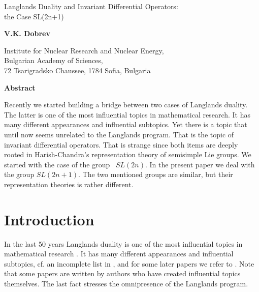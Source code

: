 \documentclass[a4paper]{jpconf}
\begin{document}
\begin{center}

{\tfont Langlands Duality and Invariant Differential Operators:\\[3pt]
the Case SL(2n+1)}

\vskip 1.5cm

{\bf V.K. Dobrev}

 \vskip 5mm

  Institute for Nuclear Research and Nuclear Energy,\\ Bulgarian
Academy of Sciences,\\ 72 Tsarigradsko Chaussee,  1784 Sofia,
Bulgaria

\end{center}

\vskip 1.5cm

 \centerline{{\bf Abstract}}

Recently we started building a bridge between two cases of Langlands duality. The latter is one of the most influential topics in mathematical research.  It has many different appearances and influential subtopics. Yet there is a topic that until now seems unrelated to the Langlands program.  That is the topic of invariant differential operators. That is strange since both items are deeply rooted in Harish-Chandra's representation theory of semisimple Lie groups.
 We started with the case of the group ~$SL(2n)$.  In the present paper we deal with the group $SL(2n+1)$. The two mentioned groups are similar, but their representation theories is rather different.


\vskip 1.5cm


\section{Introduction}

In the last 50 years Langlands duality is one of the most influential topics in mathematical research \cite{Lan1,Lan2}.  It has many different appearances and influential subtopics, cf. an incomplete list 	in \cite{VKD-L}, and for some later papers we refer to
\cite{BSV,ChNa,ChVe,Chua,DHKM,DiTe,Esp,GaTe,GaWi,HLM,Hove,Ike,Ima,JLN,KiNo,LZZ,MaOp,Mat,Nak,Suz,Col,Sch,
Nima,WangWei,GLR,DEG,HFu,PSc,DHKZ,CJSL,CHS,JaMo,DHXZ,MOi,DYa,KBa,XuYi,THove,NaYu,MSY,VWa,DaFi,Toda,JYa,ACEST,CSW,GSh,SPa,THC,BHo,DPe,KaPo,LSW,IkRa,BaDa,Lia,Gle}.
Note that some papers are written by authors who have created influential topics themselves. The last fact
stresses the omnipresence of the Langlands program.
\end{document}
